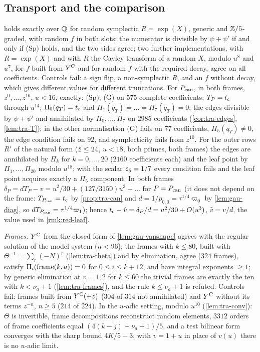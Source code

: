 \subsection{Transport and the comparison}
\label{sec:evi-transport}

 holds exactly over $\mathbb{Q}$ for random symplectic $R=\exp(X)$, generic and $\mathbb{Z}/5$-graded, with random $f$ in both slots: the numerator is divisible by $\psi+\psi'$ if and only if (Sp) holds, and the two sides agree; two further implementations, with $R=\exp(X)$ and with $R$ the Cayley transform of a random $X$, modulo $u^8$ and $u^7$, for $f$ built from $Y^{\mathrm{C}}$ and for random $f$ with the required decay, agree on all coefficients. Controls fail: a sign flip, a non-symplectic $R$, and an $f$ without decay, which gives different values for different truncations. For $P_{\mathrm{can}}$, in both frames, $z^0,\dots,z^{16}$, $u<16$, exactly: (Sp); (G) on $575$ complete coefficients; $T_P=t_{\mathrm{c}}$ through $u^{14}$; $\Pi_0(q_T)=t_{\mathrm{c}}$ and $\Pi_1(q_T)=\dots=\Pi_7(q_T)=0$; the edges divisible by $\psi+\psi'$ and annihilated by $\Pi_0,\dots,\Pi_7$ on $2985$ coefficients (\cref{cor:tra-edges}, \cref{lem:tra-T}); in the other normalisation (G) fails on $77$ coefficients, $\Pi_5(q_T)\neq 0$, the edge condition fails on $92$, and symplecticity fails from $z^{10}$. For the outer rows $R'$ of the natural form ($\hat{z}\leq 24$, $u<18$, both primes, both frames) the edges are annihilated by $\Pi_k$ for $k=0,\dots,20$ ($2160$ coefficients each) and the leaf point by $\Pi_1,\dots,\Pi_{20}$ modulo $u^{18}$; with the scalar $\mathsf{c}_5=1/7$ every condition fails and the leaf point acquires exactly a $\Pi_5$ component. In both frames $\delta_P=dT_P-v=u^2/30+(127/3150)u^3+\dots$ for $P=P_{\mathrm{can}}$ (it does not depend on the frame: $T_{P_{\mathrm{can}}}=t_{\mathrm{c}}$ by \cref{prop:tra-can} and $d=1/p_{0,0}=\tau^{1/4}\varpi_0$ by \cref{lem:gau-diag}, so $dT_{P_{\mathrm{can}}}=\tau^{1/4}\varpi_1$); hence $t_{\mathrm{c}}-\hat v=\delta_P/d=u^2/30+O(u^3)$, $\hat v=v/d$, the value used in \cref{rmk:red-leaf}.

\emph{Frames.} $Y^{\mathrm{C}}$ from the closed form of \cref{lem:gau-vanshape} agrees with the regular solution of the model system ($n<96$); the frames with $k\leq 80$, built with $\Theta^{-1}=\sum_r(-N)^r$ (\cref{lem:tra-theta}) and by elimination, agree ($324$ frames), satisfy $\Pi_i(\mathrm{frame}(k,a))=0$ for $0\leq i\leq k+12$, and have integral exponents $\geq 1$; by generic elimination at $v=1,2$ for $k\leq 60$ the trivial frames are exactly the ten with $k<\nu_a+1$ (\cref{lem:tra-frames}), and the rule $k\leq\nu_a+1$ is refuted. Controls fail: frames built from $Y^{\mathrm{C}}(+z)$ ($304$ of $314$ not annihilated) and $Y^{\mathrm{C}}$ without its terms $z^{-n}$, $n\geq 5$ ($214$ of $224$). In the $u$-adic setting, modulo $u^{10}$ (\cref{lem:tra-conv}): $\Theta$ is invertible, frame decompositions reconstruct random elements, $3312$ orders of frame coefficients equal $(4(k-j)+\nu_a+1)/5$, and a test bilinear form converges with the sharp bound $4K/5-3$; with $v=1+u$ in place of $v(u)$ there is no $u$-adic limit.

